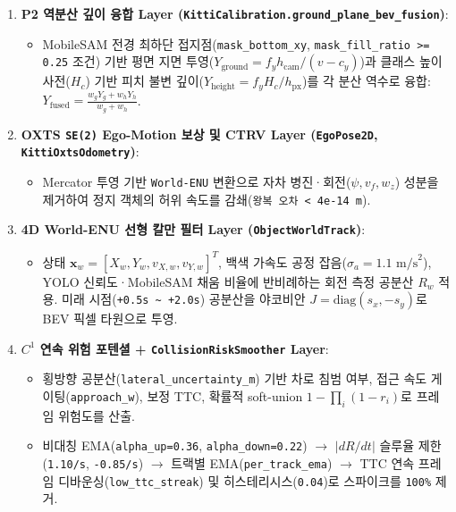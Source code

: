 \documentclass[10.5pt,a4paper]{article}
\begin{document}
\begin{enumerate}[leftmargin=1.8em,itemsep=2pt]
\item \textbf{P2 역분산 깊이 융합 Layer (\texttt{KittiCalibration.\allowbreak{}ground\_\allowbreak{}plane\_\allowbreak{}bev\_\allowbreak{}fusion})}:
\begin{itemize}[leftmargin=1.5em,itemsep=2pt]
\item MobileSAM 전경 최하단 접지점(\texttt{mask\_\allowbreak{}bottom\_\allowbreak{}xy}, \texttt{mask\_\allowbreak{}fill\_\allowbreak{}ratio >= 0.\allowbreak{}25} 조건) 기반 평면 지면 투영($Y_{\text{ground}} = f_y h_{\text{cam}} / (v - c_y)$)과 클래스 높이 사전($H_c$) 기반 피치 불변 깊이($Y_{\text{height}} = f_y H_c / h_{\text{px}}$)를 각 분산 역수로 융합: $Y_{\text{fused}} = \frac{w_g Y_g + w_h Y_h}{w_g + w_h}$.
\end{itemize}
\item \textbf{OXTS \texttt{SE(2)} Ego-Motion 보상 및 CTRV Layer (\texttt{EgoPose2D}, \texttt{KittiOxtsOdometry})}:
\begin{itemize}[leftmargin=1.5em,itemsep=2pt]
\item Mercator 투영 기반 \texttt{World-\allowbreak{}ENU} 변환으로 자차 병진·회전($\psi, v_f, w_z$) 성분을 제거하여 정지 객체의 허위 속도를 감쇄(\texttt{왕복 오차 < 4e-\allowbreak{}14 m}).
\end{itemize}
\item \textbf{4D World-ENU 선형 칼만 필터 Layer (\texttt{ObjectWorldTrack})}:
\begin{itemize}[leftmargin=1.5em,itemsep=2pt]
\item 상태 $\mathbf{x}_w = [X_w, Y_w, v_{X,w}, v_{Y,w}]^T$, 백색 가속도 공정 잡음($\sigma_a = 1.1\text{ m/s}^2$), YOLO 신뢰도·MobileSAM 채움 비율에 반비례하는 회전 측정 공분산 $R_w$ 적용. 미래 시점(\texttt{+0.\allowbreak{}5s \textasciitilde{} +2.\allowbreak{}0s}) 공분산을 야코비안 $J=\text{diag}(s_x,-s_y)$로 BEV 픽셀 타원으로 투영.
\end{itemize}
\item \textbf{$C^1$ 연속 위험 포텐셜 + \texttt{CollisionRiskSmoother} Layer}:
\begin{itemize}[leftmargin=1.5em,itemsep=2pt]
\item 횡방향 공분산(\texttt{lateral\_\allowbreak{}uncertainty\_\allowbreak{}m}) 기반 차로 침범 여부, 접근 속도 게이팅(\texttt{approach\_\allowbreak{}w}), 보정 TTC, 확률적 soft-union $1 - \prod_i (1 - r_i)$로 프레임 위험도를 산출.
\item 비대칭 EMA(\texttt{alpha\_\allowbreak{}up=0.\allowbreak{}36}, \texttt{alpha\_\allowbreak{}down=0.\allowbreak{}22}) $\rightarrow$ $|dR/dt|$ 슬루율 제한(\texttt{1.\allowbreak{}10/\allowbreak{}s}, \texttt{-\allowbreak{}0.\allowbreak{}85/\allowbreak{}s}) $\rightarrow$ 트랙별 EMA(\texttt{per\_\allowbreak{}track\_\allowbreak{}ema}) $\rightarrow$ TTC 연속 프레임 디바운싱(\texttt{low\_\allowbreak{}ttc\_\allowbreak{}streak}) 및 히스테리시스(\texttt{0.\allowbreak{}04})로 스파이크를 \texttt{100\%} 제거.
\end{itemize}
\end{enumerate}
\end{document}
